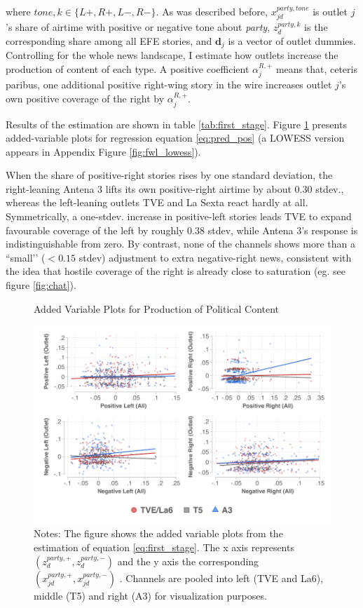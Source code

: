 \documentclass[12pt]{article}
\begin{document}
where $tone,k \in\{L+,R+,L-,R-\}$. As was described before,  $x^{party, tone}_{jd}$ is outlet $j$’s share of airtime with positive or negative tone about \emph{party}, $z^{party,k}_d$ is the corresponding share among all EFE stories, and $\bm d_j$ is a vector of outlet dummies.  Controlling for the whole news landscape, I estimate how outlets increase the production of content of each type. 
A positive coefficient $\alpha_{j}^{R,+}$ means that, ceteris paribus, one additional positive right-wing story in the wire increases outlet $j$’s own positive coverage of the right by $\alpha_{j}^{R,+}$.

Results of the estimation are shown in table \ref{tab:first_stage}. Figure \ref{fig:fwl} presents added-variable plots for regression equation  \eqref{eq:pred_pos} (a LOWESS version appears in Appendix Figure \ref{fig:fwl_lowess}).  

 When the share of  positive-right stories rises by one standard deviation, the right-leaning Antena 3 lifts its own positive-right airtime by about 0.30 stdev., whereas the left-leaning outlets TVE and La Sexta react hardly at all.  Symmetrically, a one-stdev. increase in positive-left stories leads TVE to expand favourable coverage of the left by roughly 0.38 stdev, while Antena 3’s response is indistinguishable from zero.  By contrast, none of the channels shows more than a “small’’ (\(<0.15\) stdev) adjustment to extra negative-right news, consistent with the idea that hostile coverage of the right is already close to saturation (eg. see figure \ref{fig:chat}).


	
	
		\begin{figure}[h!]
		\centering
\caption{Added Variable Plots for Production of Political Content}
		\includegraphics[width=160mm]{figures/fwl_plots}
		\caption*{\small Notes: The figure shows the added variable plots from the estimation of equation \ref{eq:first_stage}. The x axis represents $\left(z_d^{party,+},z_d^{party,-}\right) $ and the y axis the corresponding  $\left(x_{jd}^{party,+},x_{jd}^{party,-}\right) $   . Channels are pooled into left (TVE and La6), middle (T5) and right (A3) for visualization purposes.  }
		\label{fig:fwl}
	\end{figure}
	
\end{document}

